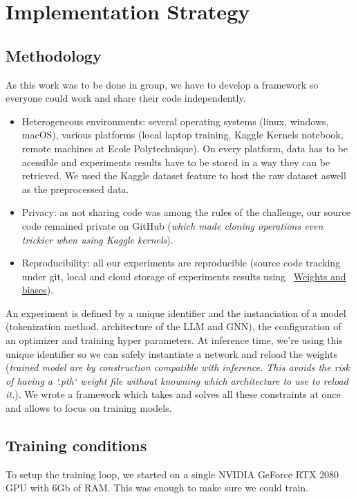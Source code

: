\section{Implementation Strategy}
\label{sec:remplementation}
\subsection*{Methodology}
\label{sec:methodology}
As this work was to  be done in group, we have to develop a framework so everyone could work and share their code independently.
\begin{itemize}
    \item Heterogeneous environments: several operating systems (linux, windows, macOS), various platforms (local laptop training, Kaggle Kernels notebook, remote machines at Ecole Polytechnique). On every platform, data has to be acessible and experiments results have to be stored in a way they can be retrieved. We used the Kaggle dataset feature to  host the raw dataset aswell as the preprocessed data.
    \item Privacy: as not sharing code was among the rules of the challenge, our source code remained private on GitHub (\textit{which made cloning operations even trickier when using Kaggle kernels}).
    \item Reproducibility: all our experiments are reproducible (source code tracking under git, local and cloud storage of experiments results using ~\href{https://wandb.ai/molecule-nlp-altegrad-23/molecule-nlp}{Weights and biases}).
\end{itemize}
An experiment is defined by a unique identifier and the instanciation of a model (tokenization method, architecture of the LLM and GNN), the configuration of an  optimizer and training hyper parameters. At inference time, we're using this unique identifier so we can safely instantiate a network and reload the weights (\textit{trained model are by construction compatible with inference. This avoids the risk of having a `.pth` weight file without knowning which architecture to use to reload it.}).
We wrote a framework which takes and solves all these constraints at once and allows to focus on training models.


\subsection*{Training conditions}
\label{sec:training conditions}
To setup the training loop, we started on a single NVIDIA GeForce RTX 2080 GPU with 6Gb of RAM. This was enough to make sure we could train.



